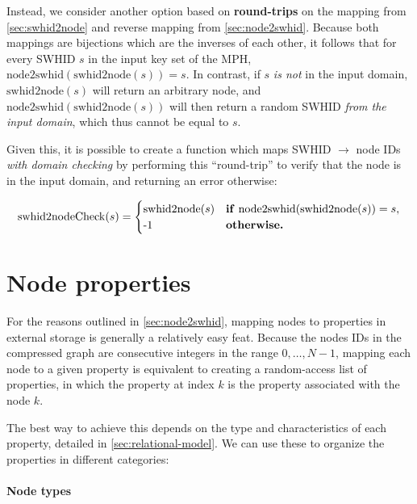 Instead, we consider another option based on \textbf{round-trips} on the
mapping from \cref{sec:swhid2node} and reverse mapping from
\cref{sec:node2swhid}.  Because both mappings are bijections which are the
inverses of each other, it follows that for every \gls{SWHID} $s$ in the input
key set of the \gls{MPH}, $\mathrm{node2swhid}(\mathrm{swhid2node}(s)) = s$.
In contrast, if $s$ \emph{is not} in the input domain, $\mathrm{swhid2node}(s)$
will return an arbitrary node, and
$\mathrm{node2swhid}(\mathrm{swhid2node}(s))$ will then return a random
\gls{SWHID} \emph{from the input domain}, which thus cannot be equal to $s$.

Given this, it is possible to create a function which maps \gls{SWHID} $\to$
node IDs \emph{with domain checking} by performing this ``round-trip'' to
verify that the node is in the input domain, and returning an error otherwise:

\[
    \mathrm{swhid2nodeCheck}(s) =
    \begin{cases}
        \mathrm{swhid2node}(s) &
        \text{\textbf{if}}~\mathrm{node2swhid}(\mathrm{swhid2node}(s)) = s,\\
        \text{-1}            & \text{\textbf{otherwise.}}
    \end{cases}
\]

\section{Node properties}

For the reasons outlined in \cref{sec:node2swhid}, mapping nodes to properties
in external storage is generally a relatively easy feat. Because the nodes IDs
in the compressed graph are consecutive integers in the range ${0,\ldots,N-1}$,
mapping each node to a given property is equivalent to creating a random-access
list of properties, in which the property at index $k$ is the property
associated with the node $k$.

The best way to achieve this depends on the type and characteristics of each
property, detailed in \cref{sec:relational-model}. We can use these to organize
the properties in different categories:

\paragraph{Node types}

